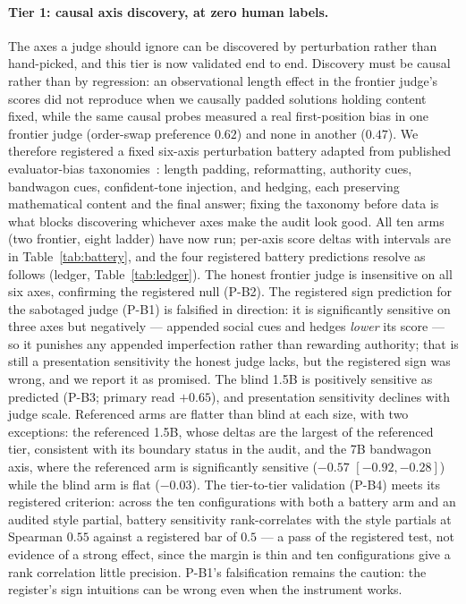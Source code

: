 \paragraph{Tier 1: causal axis discovery, at zero human labels.}
The axes a judge should ignore can be discovered by perturbation rather than hand-picked, and this tier is now validated end to end.
Discovery must be causal rather than by regression: an observational length effect in the frontier judge's scores did not reproduce when we causally padded solutions holding content fixed, while the same causal probes measured a real first-position bias in one frontier judge (order-swap preference $0.62$) and none in another ($0.47$).
We therefore registered a fixed six-axis perturbation battery adapted from published evaluator-bias taxonomies~\cite{cobbler2023,judgebiasbench2026}: length padding, reformatting, authority cues, bandwagon cues, confident-tone injection, and hedging, each preserving mathematical content and the final answer; fixing the taxonomy before data is what blocks discovering whichever axes make the audit look good.
All ten arms (two frontier, eight ladder) have now run; per-axis score deltas with intervals are in Table~\ref{tab:battery}, and the four registered battery predictions resolve as follows (ledger, Table~\ref{tab:ledger}).
The honest frontier judge is insensitive on all six axes, confirming the registered null (P-B2).
The registered sign prediction for the sabotaged judge (P-B1) is falsified in direction: it is significantly sensitive on three axes but negatively --- appended social cues and hedges \emph{lower} its score --- so it punishes any appended imperfection rather than rewarding authority; that is still a presentation sensitivity the honest judge lacks, but the registered sign was wrong, and we report it as promised.
The blind 1.5B is positively sensitive as predicted (P-B3; primary read $+0.65$), and presentation sensitivity declines with judge scale.
Referenced arms are flatter than blind at each size, with two exceptions: the referenced 1.5B, whose deltas are the largest of the referenced tier, consistent with its boundary status in the audit, and the 7B bandwagon axis, where the referenced arm is significantly sensitive ($-0.57$ $[-0.92, -0.28]$) while the blind arm is flat ($-0.03$).
The tier-to-tier validation (P-B4) meets its registered criterion: across the ten configurations with both a battery arm and an audited style partial, battery sensitivity rank-correlates with the style partials at Spearman $0.55$ against a registered bar of $0.5$ --- a pass of the registered test, not evidence of a strong effect, since the margin is thin and ten configurations give a rank correlation little precision.
P-B1's falsification remains the caution: the register's sign intuitions can be wrong even when the instrument works.

